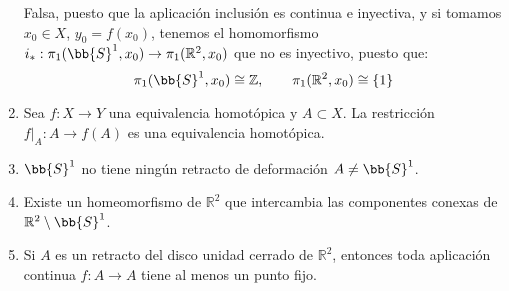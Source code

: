 \begin{ejercicio}
\begin{enumerate}[label=\alph*)]
            Falsa, puesto que la aplicación inclusión
            es continua e inyectiva, y si tomamos $x_0\in X$, $y_0 = f(x_0)$, tenemos el homomorfismo $i_\ast:\pi_1(\bb{S}^1,x_0)\to \pi_1(\mathbb{R}^2, x_0)$ que no es inyectivo, puesto que:
            \begin{equation*}
                \pi_1(\bb{S}^1,x_0) \cong \mathbb{Z}, \qquad \pi_1(\mathbb{R}^2,x_0)\cong \{1\}
            \end{equation*}
        \item Sea $f:X\to Y$ una equivalencia homotópica y $A\subset X$. La restricción $f\big|_A:A\to f(A)$ es una equivalencia homotópica.
        \item $\bb{S}^1$ no tiene ningún retracto de deformación $A\neq \bb{S}^1$.
        \item Existe un homeomorfismo de $\mathbb{R}^2$ que intercambia las componentes conexas de $\mathbb{R}^2\setminus \bb{S}^1$.
        \item Si $A$ es un retracto del disco unidad cerrado de $\mathbb{R}^2$, entonces toda aplicación continua $f:A\to A$ tiene al menos un punto fijo.
    \end{enumerate}
\end{ejercicio}
